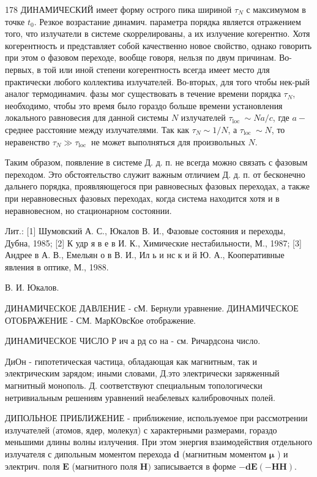 \documentclass[10pt]{article}
\begin{document}
178 ДИНАМИЧЕСКИЙ имеет форму острого пика шириной $\tau_{N}$ с максимумом в точке $t_{0}$. Резкое возрастание динамич. параметра порядка является отражением того, что излучатели в системе скоррелированы, а их излучение когерентно. Хотя когерентность и представляет собой качественно новое свойство, однако говорить при этом о фазовом переходе, вообще говоря, нельзя по двум причинам. Во-первых, в той или иной степени когерентность всегда имеет место для практически любого коллектива излучателей. Во-вторых, для того чтобы нек-рый аналог термодинамич. фазы мог существовать в течение времени порядка $\tau_{N}$, необходимо, чтобы это время было гораздо больше времени установления локального равновесия для данной системы $N$ излучателей $\tau_{\text {loc }} \sim N a / c$, где $a-$ среднее расстояние между излучателями. Так как $\tau_{N} \sim 1 / N$, а $\tau_{\text {loc }} \sim N$, то неравенство $\tau_{N} \gg \tau_{\text {loc }}$ не может выполняться для произвольных $N$.



Таким образом, появление в системе Д. д. п. не всегда можно связать с фазовым переходом. Это обстоятельство служит важным отличием Д. д. п. от бесконечно дальнего порядка, проявляющегося при равновесных фазовых переходах, а также при неравновесных фазовых переходах, когда система находится хотя и в неравновесном, но стационарном состоянии.



Лит.: [1] Шумовский А. С., Юкалов В. И., Фазовые состояния и переходы, Дубна, 1985; [2] К удр я в е в И. К., Химические нестабильности, М., 1987; [3] Андрее в А. В., Емельян о в В. И., Ил ь и нс к и й Ю. А., Кооперативные явления в оптике, М., 1988.



В. И. Юкалов.



ДИНАМИЧЕСКОЕ ДАВЛЕНИЕ - сМ. Бернули уравнение. ДИНАМИЧЕСКОЕ ОТОБРАЖЕНИЕ - СМ. МарКОвсКое отображение.



ДИНАМИЧЕСКОЕ ЧИСЛО Р ич а рд со на - см. Ричардсона число.



ДиОн - гипотетическая частица, обладающая как магнитным, так и электрическим зарядом; иными словами, Д.это электрически заряженный магнитный монополь. Д. соответствуют специальным топологически нетривиальным решениям уравнений неабелевых калибровочных полей.



ДИПОЛЬНОЕ ПРИБЛИЖЕНИЕ - приближение, используемое при рассмотрении излучателей (атомов, ядер, молекул) с характерными размерами, гораздо меньшими длины волны излучения. При этом энергия взаимодействия отдельного излучателя с дипольным моментом перехода $\boldsymbol{d}$ (магнитным моментом $\boldsymbol{\mu}$ ) и электрич. поля $\boldsymbol{E}$ (магнитного поля $\boldsymbol{H})$ записывается в форме $-\boldsymbol{d} \boldsymbol{E}(-\boldsymbol{H} \boldsymbol{H})$.
\end{document}
